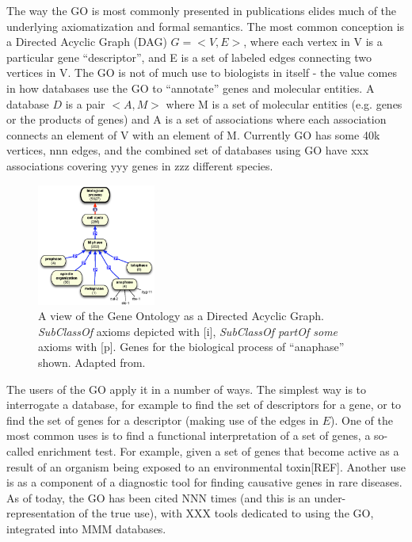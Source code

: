 \documentclass{llncs}
\begin{document}
The way the GO is most commonly presented in publications elides much
of the underlying axiomatization and formal semantics. The most common
conception is a Directed Acyclic Graph (DAG) $G = <V,E>$, where each
vertex in V is a particular gene ``descriptor'', and E is a set of
labeled edges connecting two vertices in V. The GO is not of much use
to biologists in itself - the value comes in how databases use the GO
to ``annotate'' genes and molecular entities.  A database $D$ is a
pair $<A, M>$ where M is a set of molecular entities (e.g. genes or
the products of genes) and A is a set of associations where each
association connects an element of V with an element of M. Currently
GO has some 40k vertices, nnn edges, and the combined set of databases
using GO have xxx associations covering yyy genes in zzz different
species\cite{Blake2013}.

\begin{figure}
\center
\includegraphics[height=4cm]{dag}
\caption{A view of the Gene Ontology as a Directed Acyclic
  Graph. \emph{SubClassOf} axioms depicted with [i], \emph{SubClassOf
    partOf some} axioms with [p]. Genes for the biological process of
  ``anaphase'' shown. Adapted from\cite{washington2008ontologies}. }
\end{figure}


The users of the GO apply it in a number of ways. The simplest way is
to interrogate a database, for example to find the set of descriptors
for a gene, or to find the set of genes for a descriptor (making use
of the edges in $E$). One of the most common uses is to find a
functional interpretation of a set of genes, a so-called enrichment
test. For example, given a set of genes that become active as a result
of an organism being exposed to an environmental toxin[REF]. Another
use is as a component of a diagnostic tool for finding causative genes
in rare diseases\cite{Phevor}. As of today, the GO has been cited NNN
times (and this is an under-representation of the true use), with XXX
tools dedicated to using the GO, integrated into MMM databases.
\end{document}
